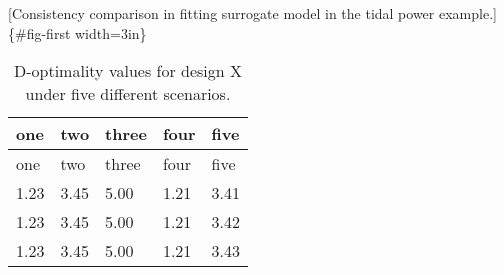 \documentclass[
  12pt]{article}
\begin{document}
{[}Consistency comparison in fitting surrogate model in the tidal power
example.{]}\{\#fig-first width=3in\}

\hypertarget{tbl-one}{}
\begin{longtable}[]{@{}lllll@{}}
\caption{\label{tbl-one}D-optimality values for design X under five
different scenarios.}\tabularnewline
\toprule()
one & two & three & four & five \\
\midrule()
\endfirsthead
\toprule()
one & two & three & four & five \\
\midrule()
\endhead
1.23 & 3.45 & 5.00 & 1.21 & 3.41 \\
1.23 & 3.45 & 5.00 & 1.21 & 3.42 \\
1.23 & 3.45 & 5.00 & 1.21 & 3.43 \\
\bottomrule()
\end{longtable}

\addtolength{\textheight}{.5in}%

\addtolength{\textheight}{-.5in}%


  
\end{document}
